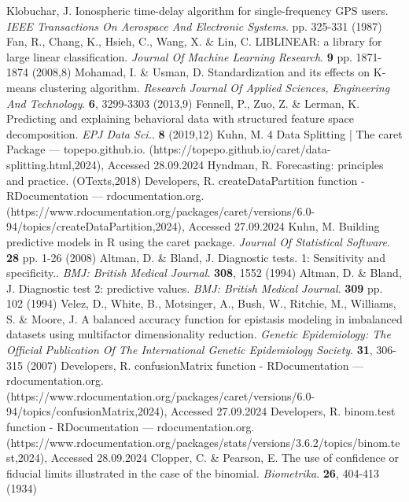 \documentclass[sn-mathphys-num]{sn-jnl}%
\begin{document}
\begin{thebibliography}{000}
Klobuchar, J. Ionospheric time-delay algorithm for single-frequency GPS users. {\em IEEE Transactions On Aerospace And Electronic Systems}. pp. 325-331 (1987)
Fan, R., Chang, K., Hsieh, C., Wang, X. \& Lin, C. LIBLINEAR: a library for large linear classification. {\em Journal Of Machine Learning Research}. \textbf{9} pp. 1871-1874 (2008,8)
Mohamad, I. \& Usman, D. Standardization and its effects on K-means clustering algorithm. {\em Research Journal Of Applied Sciences, Engineering And Technology}. \textbf{6}, 3299-3303 (2013,9)
Fennell, P., Zuo, Z. \& Lerman, K. Predicting and explaining behavioral data with structured feature space decomposition. {\em EPJ Data Sci.}. \textbf{8} (2019,12)
Kuhn, M. 4 Data Splitting | The caret Package — topepo.github.io. (https://topepo.github.io/caret/data-splitting.html,2024), Accessed 28.09.2024
Hyndman, R. Forecasting: principles and practice. (OTexts,2018)
Developers, R. createDataPartition function - RDocumentation — rdocumentation.org. (https://www.rdocumentation.org/packages/caret/versions/6.0-94/topics/createDataPartition,2024), Accessed 27.09.2024
Kuhn, M. Building predictive models in R using the caret package. {\em Journal Of Statistical Software}. \textbf{28} pp. 1-26 (2008)
Altman, D. \& Bland, J. Diagnostic tests. 1: Sensitivity and specificity.. {\em BMJ: British Medical Journal}. \textbf{308}, 1552 (1994)
Altman, D. \& Bland, J. Diagnostic test 2: predictive values. {\em BMJ: British Medical Journal}. \textbf{309} pp. 102 (1994)
Velez, D., White, B., Motsinger, A., Bush, W., Ritchie, M., Williams, S. \& Moore, J. A balanced accuracy function for epistasis modeling in imbalanced datasets using multifactor dimensionality reduction. {\em Genetic Epidemiology: The Official Publication Of The International Genetic Epidemiology Society}. \textbf{31}, 306-315 (2007)
Developers, R. confusionMatrix function - RDocumentation — rdocumentation.org. (https://www.rdocumentation.org/packages/caret/versions/6.0-94/topics/confusionMatrix,2024), Accessed 27.09.2024
Developers, R. binom.test function - RDocumentation — rdocumentation.org. (https://www.rdocumentation.org/packages/stats/versions/3.6.2/topics/binom.test,2024), Accessed 28.09.2024
Clopper, C. \& Pearson, E. The use of confidence or fiducial limits illustrated in the case of the binomial. {\em Biometrika}. \textbf{26}, 404-413 (1934)

\end{thebibliography}
\end{document}
